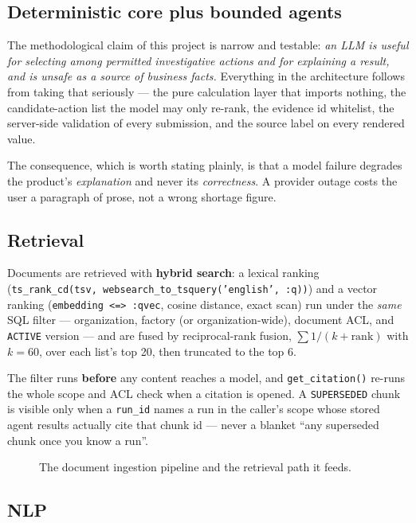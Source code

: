 \documentclass[11pt,a4paper]{article}
\begin{document}
\subsection{Deterministic core plus bounded agents}

The methodological claim of this project is narrow and testable: \emph{an LLM
is useful for selecting among permitted investigative actions and for
explaining a result, and is unsafe as a source of business facts.} Everything
in the architecture follows from taking that seriously --- the pure calculation
layer that imports nothing, the candidate-action list the model may only
re-rank, the evidence id whitelist, the server-side validation of every
submission, and the source label on every rendered value.

The consequence, which is worth stating plainly, is that a model failure
degrades the product's \emph{explanation} and never its \emph{correctness}. A
provider outage costs the user a paragraph of prose, not a wrong shortage
figure.

\subsection{Retrieval}

Documents are retrieved with \textbf{hybrid search}: a lexical ranking
(\texttt{ts\_rank\_cd(tsv, websearch\_to\_tsquery('english', :q))}) and a vector
ranking (\texttt{embedding <=> :qvec}, cosine distance, exact scan) run under
the \emph{same} SQL filter --- organization, factory (or organization-wide),
document ACL, and \texttt{ACTIVE} version --- and are fused by reciprocal-rank
fusion, $\sum 1/(k + \text{rank})$ with $k = 60$, over each list's top 20, then
truncated to the top 6.

The filter runs \textbf{before} any content reaches a model, and
\texttt{get\_citation()} re-runs the whole scope and ACL check when a citation
is opened. A \texttt{SUPERSEDED} chunk is visible only when a \texttt{run\_id}
names a run in the caller's scope whose stored agent results actually cite that
chunk id --- never a blanket ``any superseded chunk once you know a run''.

\begin{figure}[p]
\centering
\resizebox{\textwidth}{!}{}
\caption{The document ingestion pipeline and the retrieval path it feeds.}
\label{fig:docs}
\end{figure}

\subsection{NLP}
\end{document}
